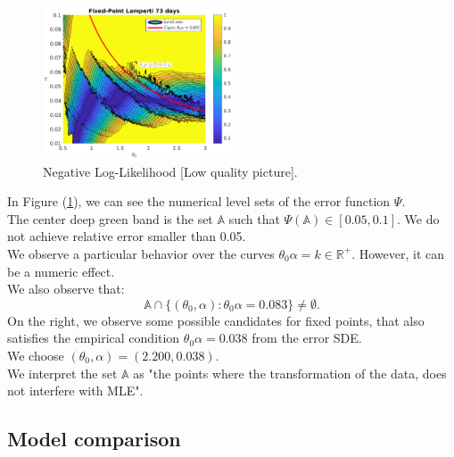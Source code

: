 \documentclass[11pt]{article}
\theoremstyle{definition}
\newcommand{\R}{\mathbb{R}}
\begin{document}
\begin{figure}[H]
\centering
\includegraphics[width=0.5\textwidth]{../../MATLAB_Files/Results/likelihood/lamperti/Log-Likelihood.eps}
\caption{Negative Log-Likelihood {\color{red}[Low quality picture]}.}
\label{fig:neg-LLL}
\end{figure}
In Figure (\ref{fig:neg-LLL}), we can see the numerical level sets of the error function $\Psi$.\\
The center deep green band is the set $\mathbb{A}$ such that $\Psi(\mathbb{A})\in[0.05,0.1]$. We do not achieve relative error smaller than 0.05.\\
We observe a particular behavior over the curves $\theta_0\alpha=k\in\R^+$. However, it can be a numeric effect.\\
We also observe that: $$\mathbb{A}\cap\{(\theta_0,\alpha):\theta_0\alpha=0.083\}\neq\emptyset.$$
On the right, we observe some possible candidates for fixed points, that also satisfies the empirical condition $\theta_0\alpha=0.038$ from the error SDE.\\
We choose $(\theta_0,\alpha)=(2.200,0.038)$.\\
We interpret the set $\mathbb{A}$ as "the points where the transformation of the data, does not interfere with MLE".



\subsection{Model comparison} \label{Model_Comp}
\end{document}

